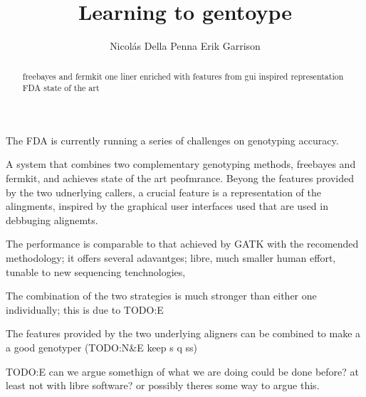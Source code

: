 \documentclass{article}
\title{Learning to gentoype}
\author{
Nicol\'as Della Penna
\And
Erik Garrison \\
} %
\begin{document}

\maketitle

\begin{abstract}
freebayes and fermkit one liner
enriched with features from gui inspired representation
FDA state of the art
\end{abstract}


The FDA is currently running a series of challenges on genotyping accuracy.

A system that combines two complementary genotyping methods, freebayes and fermkit, and achieves state of the art peofmrance.
Beyong the features provided by the two udnerlying callers, a crucial feature is a representation of the alingments, inspired by the graphical user interfaces used that are used in debbuging alignemts.

The performance is comparable to that achieved by GATK with the recomended methodology; it offers several adavantges; libre, much smaller human effort, tunable to new sequencing tenchnologies,  



The combination of the two strategies is much stronger than either one individually; this is due to TODO:E



The features provided by the two underlying aligners can be combined to make a a good genotyper (TODO:N&E keep s q ss)



TODO:E can we argue somethign of what we are doing could be done before? at least not with libre software? or possibly theres some way to argue this.
\end{document}
